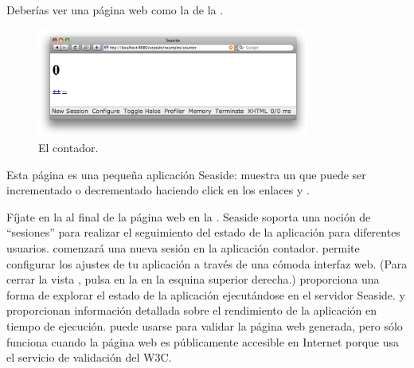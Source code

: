 \documentclass[a4paper,10pt,twoside]{book}
\begin{document}

\noindent
Deberías ver una página web como la de la .

\noindent
{}

\begin{figure}[htb]
\begin{center}
\includegraphics[width=0.8\textwidth]{counter}
\caption{El contador.}
\end{center}
\end{figure}

\noindent
Esta página es una pequeña aplicación Seaside: muestra un  que puede ser incrementado o decrementado haciendo click en los enlaces \link{++} y \link{--\,--}.

\noindent
{} 

Fíjate en la  al final de la página web en la .
Seaside soporta una noción de ``sesiones'' para realizar el seguimiento del estado de la aplicación para diferentes usuarios.
 comenzará una nueva sesión en la aplicación contador.
 permite configurar los ajustes de tu aplicación a través de una cómoda interfaz web.
(Para cerrar la vista , pulsa en la  en la esquina superior derecha.)
 proporciona una forma de explorar el estado de la aplicación ejecutándose en el servidor Seaside.
 y  proporcionan información detallada sobre el rendimiento de la aplicación en tiempo de ejecución.
 puede usarse para validar la página web generada, pero sólo funciona cuando la página web es públicamente accesible en Internet porque usa el servicio de validación del W3C.
\end{document}

